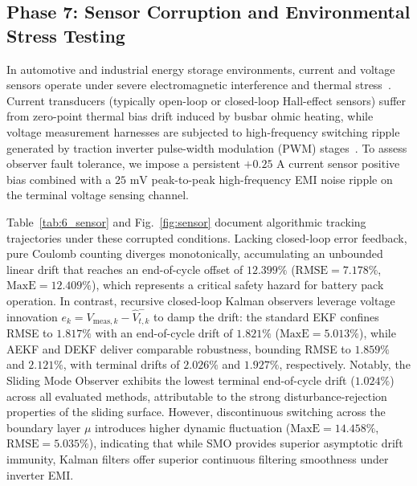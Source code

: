 \documentclass[balance,nocopyright,upint,varvw,hyphenate,barcolor=NavyBlue,nolists]{asmejour}
\begin{document}
\subsection{Phase 7: Sensor Corruption and Environmental Stress Testing}
In automotive and industrial energy storage environments, current and voltage sensors operate under severe electromagnetic interference and thermal stress~\cite{Hashemi2020}. Current transducers (typically open-loop or closed-loop Hall-effect sensors) suffer from zero-point thermal bias drift induced by busbar ohmic heating, while voltage measurement harnesses are subjected to high-frequency switching ripple generated by traction inverter pulse-width modulation (PWM) stages~\cite{Zheng2018inconsistency}. To assess observer fault tolerance, we impose a persistent $+0.25\text{ A}$ current sensor positive bias combined with a $25\text{ mV}$ peak-to-peak high-frequency EMI noise ripple on the terminal voltage sensing channel.

Table~\ref{tab:6_sensor} and Fig.~\ref{fig:sensor} document algorithmic tracking trajectories under these corrupted conditions. Lacking closed-loop error feedback, pure Coulomb counting diverges monotonically, accumulating an unbounded linear drift that reaches an end-of-cycle offset of $12.399\%$ ($\text{RMSE} = 7.178\%$, $\text{MaxE} = 12.409\%$), which represents a critical safety hazard for battery pack operation. In contrast, recursive closed-loop Kalman observers leverage voltage innovation $e_k = V_{\text{meas},k} - \hat{V}_{t,k}^-$ to damp the drift: the standard EKF confines RMSE to $1.817\%$ with an end-of-cycle drift of $1.821\%$ ($\text{MaxE} = 5.013\%$), while AEKF and DEKF deliver comparable robustness, bounding RMSE to $1.859\%$ and $2.121\%$, with terminal drifts of $2.026\%$ and $1.927\%$, respectively. Notably, the Sliding Mode Observer exhibits the lowest terminal end-of-cycle drift ($1.024\%$) across all evaluated methods, attributable to the strong disturbance-rejection properties of the sliding surface. However, discontinuous switching across the boundary layer $\mu$ introduces higher dynamic fluctuation ($\text{MaxE} = 14.458\%$, $\text{RMSE} = 5.035\%$), indicating that while SMO provides superior asymptotic drift immunity, Kalman filters offer superior continuous filtering smoothness under inverter EMI.
\end{document}
